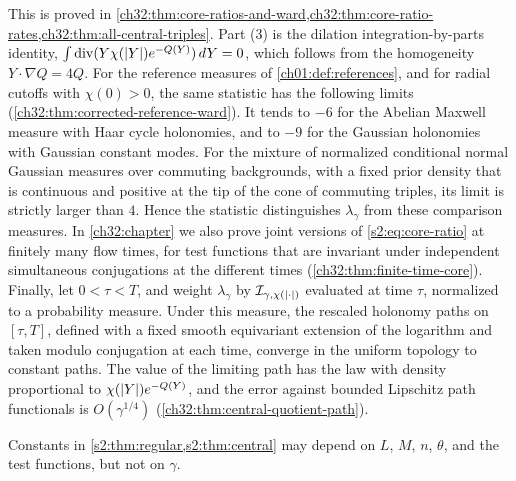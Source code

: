 This is proved in \cref{ch32:thm:core-ratios-and-ward,ch32:thm:core-ratio-rates,ch32:thm:all-central-triples}. Part (3) is the dilation integration-by-parts identity, $\int\operatorname{div}(Y\chi(\lvert Y\rvert)e^{-Q(Y)})\,dY=0$, which follows from the homogeneity $Y\cdot\nabla Q=4Q$. For the reference measures of \cref{ch01:def:references}, and for radial cutoffs with $\chi(0)>0$, the same statistic has the following limits (\cref{ch32:thm:corrected-reference-ward}). It tends to $-6$ for the Abelian Maxwell measure with Haar cycle holonomies, and to $-9$ for the Gaussian holonomies with Gaussian constant modes. For the mixture of normalized conditional normal Gaussian measures over commuting backgrounds, with a fixed prior density that is continuous and positive at the tip of the cone of commuting triples, its limit is strictly larger than $4$. Hence the statistic distinguishes $\lambda_\gamma$ from these comparison measures. In \cref{ch32:chapter} we also prove joint versions of \eqref{s2:eq:core-ratio} at finitely many flow times, for test functions that are invariant under independent simultaneous conjugations at the different times (\cref{ch32:thm:finite-time-core}). Finally, let $0<\tau<T$, and weight $\lambda_\gamma$ by $\mathcal I_{\gamma,\chi(\lvert \cdot\rvert)}$ evaluated at time $\tau$, normalized to a probability measure. Under this measure, the rescaled holonomy paths on $[\tau,T]$, defined with a fixed smooth equivariant extension of the logarithm and taken modulo conjugation at each time, converge in the uniform topology to constant paths. The value of the limiting path has the law with density proportional to $\chi(\lvert Y\rvert)e^{-Q(Y)}$, and the error against bounded Lipschitz path functionals is $O(\gamma^{1/4})$ (\cref{ch32:thm:central-quotient-path}).

Constants in \cref{s2:thm:regular,s2:thm:central} may depend on $L$, $M$, $n$, $\theta$, and the test functions, but not on $\gamma$.
